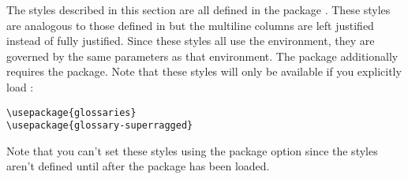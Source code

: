 \documentclass[report]{nlctdoc}
\begin{document}
The styles described in this section are all defined in the package
. These styles are analogous to those
defined in  but the multiline columns are left
justified instead of fully justified. Since these styles all use the
 environment, they are governed by the same
parameters as that environment. The 
package additionally requires the  package.  Note that
these styles will only be available if you explicitly load
:
\begin{verbatim}
\usepackage{glossaries}
\usepackage{glossary-superragged}
\end{verbatim}
Note that you can't set these styles using the 
package option since the styles aren't defined until after
the  package has been loaded.
\end{document}
